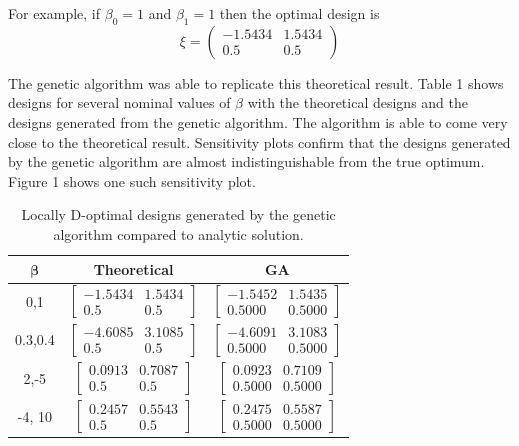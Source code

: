 \documentclass[11pt,a4paper]{article}
\begin{document}
For example, if $\beta_0 = 1$ and $\beta_1 = 1$ then the optimal design is
$$
\xi = \begin{pmatrix}
-1.5434 & 1.5434\\ 0.5 & 0.5
\end{pmatrix}
$$

The genetic algorithm was able to replicate this theoretical result. Table 1 shows designs for several nominal values of $\beta$ with the theoretical designs and the designs generated from the genetic algorithm. The algorithm is able to come very close to the theoretical result. Sensitivity plots confirm that the designs generated by the genetic algorithm are almost indistinguishable from the true optimum. Figure 1 shows one such sensitivity plot.
\begin{table}[ht]
\centering
\begin{tabular}{|c|c|c|}
\hline 
$\mathbf{\beta}$ & \textbf{Theoretical} & \textbf{GA} \\ 
\hline 
0,1 & $\begin{bmatrix}
-1.5434 & 1.5434\\ 0.5 & 0.5
\end{bmatrix}$  & $\begin{bmatrix}
-1.5452 & 1.5435\\ 0.5000 & 0.5000
\end{bmatrix}$ \\ 
\hline 
0.3,0.4 & $\begin{bmatrix}
-4.6085 & 3.1085\\ 0.5 & 0.5
\end{bmatrix}$  & $\begin{bmatrix}
-4.6091 & 3.1083\\ 0.5000 & 0.5000
\end{bmatrix}$ \\ 
\hline 
2,-5 & $\begin{bmatrix}
0.0913 & 0.7087\\ 0.5 & 0.5
\end{bmatrix}$  & $\begin{bmatrix}
0.0923 & 0.7109\\ 0.5000 & 0.5000
\end{bmatrix}$  \\ 
\hline
-4, 10 & $\begin{bmatrix}
0.2457 & 0.5543\\ 0.5 & 0.5
\end{bmatrix}$  & $\begin{bmatrix}
0.2475 & 0.5587\\ 0.5000 & 0.5000
\end{bmatrix}$\\
\hline 

\end{tabular} 
\caption{Locally D-optimal designs generated by the genetic algorithm compared to analytic solution.}
\end{table}
\end{document}
